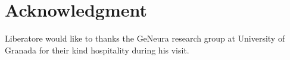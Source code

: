 \documentclass[journal]{IEEEtran}
\begin{document}
\section*{Acknowledgment}
Liberatore would like to thanks the GeNeura research group at
University of Granada for their kind hospitality during his visit.




% 







\end{document}
